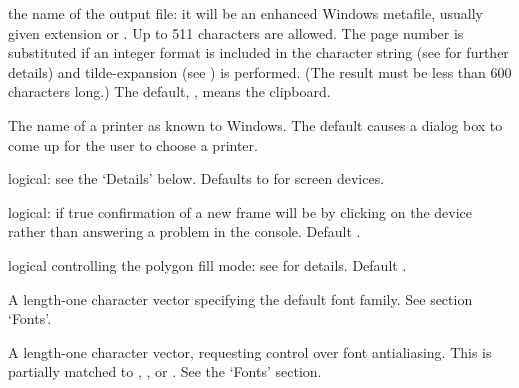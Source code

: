\begin{Arguments}
\begin{ldescription}
\item[\code{filename}] the name of the output file: it will be an enhanced
Windows metafile, usually given extension  or
.  Up to 511 characters are allowed. The page number is
substituted if an integer format is included in the character
string (see  for further details) and
tilde-expansion (see ) is performed. (The
result must be less than 600 characters long.)  The default,
, means the clipboard.
\item[\code{printer}] The name of a printer as known to Windows. The default
causes a dialog box to come up for the user to choose a printer.
\item[\code{restoreConsole}] logical:  see the `Details' below.  Defaults to
 for screen devices.
\item[\code{clickToConfirm}] logical: if true confirmation of a new frame
will be by clicking on the device rather than answering a problem in
the console.  Default .
\item[\code{fillOddEven}] logical controlling the polygon fill mode:  see
 for details.  Default .
\item[\code{family}] A length-one character vector specifying the default
font family.  See section `Fonts'.
\item[\code{antialias}] A length-one character vector, requesting control
over font antialiasing.  This is partially matched to
, ,  or
.  See the `Fonts' section.
\end{ldescription}
\end{Arguments}
%
